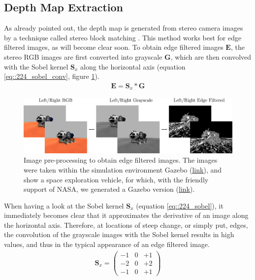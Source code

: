 \subsection{Depth Map Extraction}
As already pointed out, the depth map is generated from stereo camera images by a technique called stereo block matching \cite{hamzah2010sum}. This method works best for edge filtered images, as will become clear soon. To obtain edge filtered images $\bm{E}$, the stereo RGB images are first converted into grayscale $\bm{G}$, which are then convolved with the Sobel kernel $\bm{S}_x$ along the horizontal axis \cite{sobel2014an} (equation \ref{eq::224_sobel_conv}, figure \ref{fig::224_image_preprocessing}). 
\begin{align}
	\bm{E} = \bm{S}_x*\bm{G}
	\label{eq::224_sobel_conv}
\end{align}
\begin{figure}[h!]
	\centering
	\includegraphics[scale=.28]{chapters/03_principles_of_machine_learning/img/image_preprocessing.png}
	\caption{Image pre-processing to obtain edge filtered images. The images were taken within the simulation environment Gazebo (\href{http://gazebosim.org/}{\underline{link}}), and show a space exploration vehicle, for which, with the friendly support of NASA, we generated a Gazebo version (\href{https://github.com/mhubii/gazebo_models}{\underline{link}}).}
	\label{fig::224_image_preprocessing}
\end{figure}
When having a look at the Sobel kernel $\bm{S}_x$ (equation \ref{eq::224_sobel}), it immediately becomes clear that it approximates the derivative of an image along the horizontal axis. Therefore, at locations of steep change, or simply put, edges, the convolution of the grayscale images with the Sobel kernel results in high values, and thus in the typical appearance of an edge filtered image.
\begin{align}
	\bm{S}_x=
	\begin{pmatrix}
		-1 & 0 & +1 \\
		-2 & 0 & +2 \\
		-1 & 0 & +1
	\end{pmatrix}
	\label{eq::224_sobel}
\end{align}
